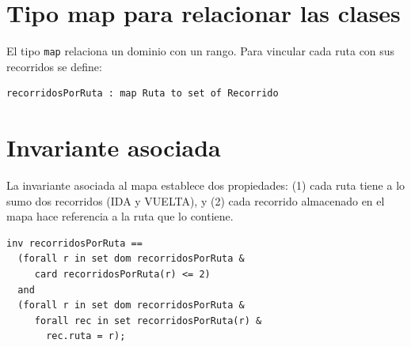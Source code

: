 \documentclass[11pt,a4paper]{article}
\begin{document}
\section{Tipo map para relacionar las clases}

El tipo \texttt{map} relaciona un dominio con un rango. Para vincular cada ruta con sus recorridos se define:

\begin{lstlisting}
recorridosPorRuta : map Ruta to set of Recorrido
\end{lstlisting}

\section{Invariante asociada}

La invariante asociada al mapa establece dos propiedades: (1) cada ruta tiene a lo sumo dos recorridos (IDA y VUELTA), y (2) cada recorrido almacenado en el mapa hace referencia a la ruta que lo contiene.

\begin{lstlisting}
inv recorridosPorRuta ==
  (forall r in set dom recorridosPorRuta &
     card recorridosPorRuta(r) <= 2)
  and
  (forall r in set dom recorridosPorRuta &
     forall rec in set recorridosPorRuta(r) &
       rec.ruta = r);
\end{lstlisting}
\end{document}

